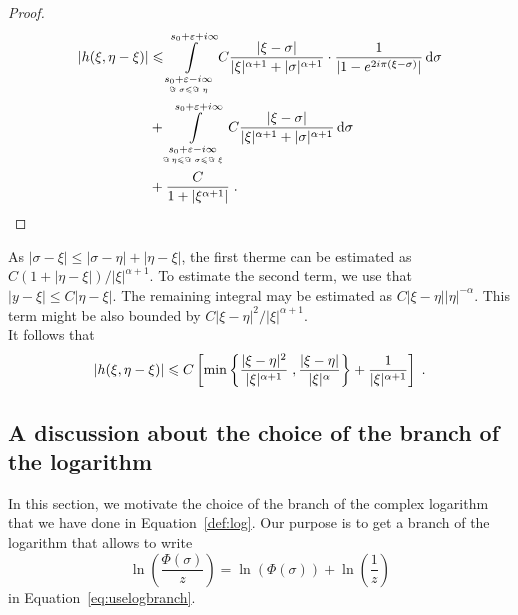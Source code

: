 \begin{proof}
\begin{align*}
    |h(\xi, \eta-\xi)| 
    &\leqslant  \int\limits_{\underset{\Im\;\sigma \leqslant \Im\;\eta}{s_0+\varepsilon-i\infty}}^{s_0+\varepsilon+i\infty}
    C \frac{|\xi - \sigma|}{|\xi|^{\alpha+1} + |\sigma|^{\alpha+1}} \cdot
         \frac{1}{|1-e^{2i\pi(\xi-\sigma)}|}
      \,\mathrm{d} \sigma \\
    &+  \int\limits_{\underset{\Im\, \eta \leqslant \Im\;\sigma \leqslant \Im\;\xi}{s_0+\varepsilon-i\infty}}^{s_0+\varepsilon+i\infty}
     C \frac{|\xi - \sigma|}{|\xi|^{\alpha+1} + |\sigma|^{\alpha+1}}
       \,\mathrm{d} \sigma \\
    &+ \frac{C}{1 + |\xi^{\alpha+1}|}
      \; .
\end{align*}
\end{proof}

As $|\sigma - \xi| \leq |\sigma - \eta| + |\eta - \xi|$, the first therme can be estimated as $C(1 + |\eta-\xi|)/|\xi|^{\alpha+1}$. 
To estimate the second term, we use that $|y-\xi| \leq C|\eta-\xi|$. The remaining integral may be estimated as $C |\xi-\eta| |\eta|^{-\alpha}$. This term might be also bounded by $C|\xi-\eta|^2/|\xi|^{\alpha+1}$.\\

It follows that 
\begin{align*}
    |h(\xi, \eta-\xi)| \leqslant C \left[\min \left\{ \frac{|\xi - \eta|^2}{|\xi|^{\alpha+1}} \;, \frac{|\xi-\eta|}{|\xi|^{\alpha}}\right\} + \frac{1}{|\xi|^{\alpha+1}} \right] \; .
\end{align*}

\subsection{A discussion about the choice of the branch of the logarithm}
In this section, we motivate the choice of the branch of the complex logarithm that we have done in Equation~\eqref{def:log}. Our purpose is to get a branch of the logarithm that allows to write 
    $$ \ln(\frac{\Phi(\sigma)}{z}) = \ln(\Phi(\sigma)) + \ln(\frac{1}{z})$$
in Equation~\eqref{eq:uselogbranch}. \\

